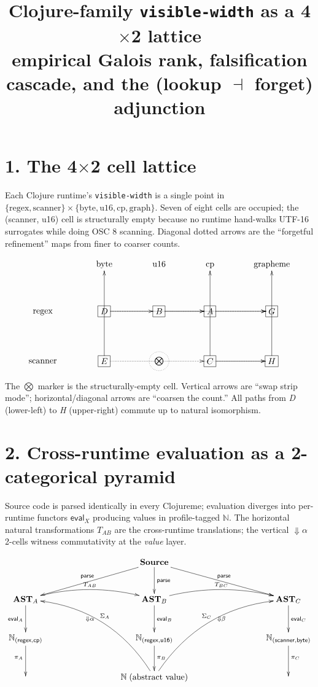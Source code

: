 \documentclass[11pt]{article}
\title{Clojure-family \texttt{visible-width} as a 4$\times$2 lattice\\
{\large empirical Galois rank, falsification cascade, and the (lookup $\dashv$ forget) adjunction}}
\author{}
\date{}
\begin{document}
\maketitle

\section*{1. The 4$\times$2 cell lattice}

Each Clojure runtime's \texttt{visible-width} is a single point in
$\{\text{regex}, \text{scanner}\} \times \{\text{byte}, \text{u16}, \text{cp}, \text{graph}\}$.
Seven of eight cells are occupied; the (\textsf{scanner}, u16) cell is structurally
empty because no runtime hand-walks UTF-16 surrogates while doing OSC 8 scanning.
Diagonal dotted arrows are the ``forgetful refinement'' maps from finer to coarser counts.

\[
\xymatrix@C=4em@R=4em{
                 & \text{byte}
                 & \text{u16}
                 & \text{cp}
                 & \text{grapheme} \\
  \text{regex}  &
       *+[F]{D}\ar[r]\ar@{.>}[rr]\ar@{.>}[rrr]
       &
       *+[F]{B}\ar[r]\ar@{.>}[rr]
       &
       *+[F]{A}\ar[r] &
       *+[F]{G} \\
  \text{scanner}&
       *+[F]{E}\ar[uu]\ar@{.>}[rr]\ar@{.>}[rrr]
       &
       *++[o][F.]{\bigotimes}
       &
       *+[F]{C}\ar[uu]\ar[r] &
       *+[F]{H}\ar[uu]
}
\]

The \texttt{$\bigotimes$} marker is the structurally-empty cell.
Vertical arrows are ``swap strip mode''; horizontal/diagonal arrows are
``coarsen the count.'' All paths from \emph{D} (lower-left) to \emph{H}
(upper-right) commute up to natural isomorphism.

\newpage
\section*{2. Cross-runtime evaluation as a 2-categorical pyramid}

Source code is parsed identically in every Clojureme; evaluation diverges
into per-runtime functors $\mathsf{eval}_X$ producing values in
profile-tagged $\mathbb{N}$. The horizontal natural transformations
$T_{AB}$ are the cross-runtime translations; the vertical $\Downarrow\alpha$
2-cells witness commutativity at the \emph{value} layer.

\[
\xymatrix@C=4em@R=3em{
   & & \mathbf{Source}\ar[dll]_{\mathsf{parse}}\ar[d]^{\mathsf{parse}}\ar[drr]^{\mathsf{parse}} & & \\
   \mathbf{AST}_A\ar[d]_{\mathsf{eval}_A}
       \ar@/^1pc/[rr]^{T_{AB}}
   & & \mathbf{AST}_B\ar[d]^{\mathsf{eval}_B}
       \ar@/^1pc/[rr]^{T_{BC}}
   & & \mathbf{AST}_C\ar[d]^{\mathsf{eval}_C} \\
   \mathbb{N}_{(\textsf{regex},\textsf{cp})}
       \ar[d]_{\pi_A}
   & & \mathbb{N}_{(\textsf{regex},\textsf{u16})}
       \ar@{}[ull]|{\Downarrow\alpha}
       \ar[d]^{\pi_B}
   & & \mathbb{N}_{(\textsf{scanner},\textsf{byte})}
       \ar@{}[ull]|{\Downarrow\beta}
       \ar[d]^{\pi_C} \\
   & & \mathbb{N}\;(\text{abstract value})
       \ar@/_2pc/[uull]_{\Sigma_A}
       \ar@/^2pc/[uurr]^{\Sigma_C}
   & &
}
\]
\end{document}
